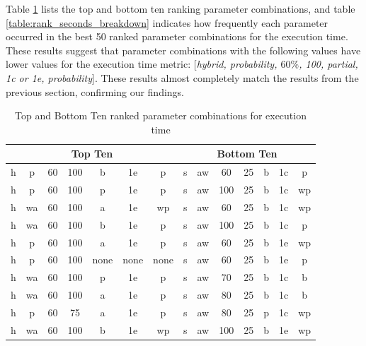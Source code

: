 
Table \ref{table:rank_seconds_top_bottom_10} lists the top and bottom ten ranking parameter combinations, and table \ref{table:rank_seconds_breakdown} indicates how frequently each parameter occurred in the best 50 ranked parameter combinations for the execution time. These results suggest that parameter combinations with the following values have lower values for the execution time metric: [\textit{hybrid, probability, $60\%$, 100, partial, 1c or 1e, probability}]. These results almost completely match the results from the previous section, confirming our findings.

\begin{table}[]
\centering
\caption{\label{table:rank_seconds_top_bottom_10}Top and Bottom Ten ranked parameter combinations for execution time}
\begin{tabular}{|c|c|c|c|c|c|c||c|c|c|c|c|c|c|}
\hline
\multicolumn{7}{|c||}{\textbf{Top Ten}} & \multicolumn{7}{c|}{\textbf{Bottom Ten}} \\ \hline \hhline{=======#=======}
h & p & 60 & 100 & b & 1e & p & s & aw & 60 & 25 & b & 1c & p \\ \hline
h & p & 60 & 100 & p & 1e & p & s & aw & 100 & 25 & b & 1c & wp \\ \hline
h & wa & 60 & 100 & a & 1e & wp & s & aw & 60 & 25 & b & 1c & wp \\ \hline
h & wa & 60 & 100 & b & 1e & p & s & aw & 100 & 25 & b & 1c & p \\ \hline
h & p & 60 & 100 & a & 1e & p & s & aw & 60 & 25 & b & 1e & wp \\ \hline
h & p & 60 & 100 & none & none & none & s & aw & 60 & 25 & b & 1e & p \\ \hline
h & wa & 60 & 100 & p & 1e & p & s & aw & 70 & 25 & b & 1c & b \\ \hline
h & wa & 60 & 100 & a & 1e & p & s & aw & 80 & 25 & b & 1c & b \\ \hline
h & p & 60 & 75 & a & 1e & p & s & aw & 80 & 25 & p & 1c & wp \\ \hline
h & wa & 60 & 100 & b & 1e & wp & s & aw & 100 & 25 & b & 1e & wp \\ \hline
\end{tabular}
\end{table}

